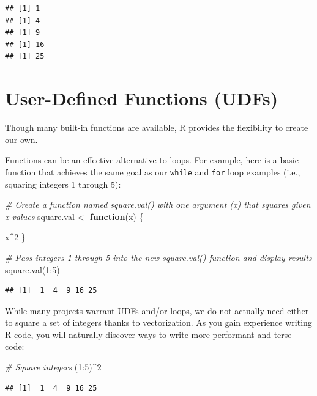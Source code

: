 \documentclass[
]{book}
\newenvironment{Shaded}{\begin{snugshade}}{\end{snugshade}}
\newcommand{\CommentTok}[1]{\textcolor[rgb]{0.56,0.35,0.01}{\textit{#1}}}
\newcommand{\ControlFlowTok}[1]{\textcolor[rgb]{0.13,0.29,0.53}{\textbf{#1}}}
\newcommand{\DecValTok}[1]{\textcolor[rgb]{0.00,0.00,0.81}{#1}}
\newcommand{\FunctionTok}[1]{\textcolor[rgb]{0.00,0.00,0.00}{#1}}
\newcommand{\NormalTok}[1]{#1}
\newcommand{\OtherTok}[1]{\textcolor[rgb]{0.56,0.35,0.01}{#1}}
\newcommand{\SpecialCharTok}[1]{\textcolor[rgb]{0.00,0.00,0.00}{#1}}
\begin{document}
\begin{verbatim}
## [1] 1
## [1] 4
## [1] 9
## [1] 16
## [1] 25
\end{verbatim}

\hypertarget{user-defined-functions-udfs}{%
\section{User-Defined Functions (UDFs)}\label{user-defined-functions-udfs}}

Though many built-in functions are available, R provides the flexibility to create our own.

Functions can be an effective alternative to loops. For example, here is a basic function that achieves the same goal as our \texttt{while} and \texttt{for} loop examples (i.e., squaring integers 1 through 5):

\begin{Shaded}
\begin{Highlighting}[]
\CommentTok{\# Create a function named square.val() with one argument (x) that squares given x values}
\NormalTok{square.val }\OtherTok{\textless{}{-}} \ControlFlowTok{function}\NormalTok{(x) \{}
  
\NormalTok{  x}\SpecialCharTok{\^{}}\DecValTok{2}
\NormalTok{\}}

\CommentTok{\# Pass integers 1 through 5 into the new square.val() function and display results}
\FunctionTok{square.val}\NormalTok{(}\DecValTok{1}\SpecialCharTok{:}\DecValTok{5}\NormalTok{)}
\end{Highlighting}
\end{Shaded}

\begin{verbatim}
## [1]  1  4  9 16 25
\end{verbatim}

While many projects warrant UDFs and/or loops, we do not actually need either to square a set of integers thanks to vectorization. As you gain experience writing R code, you will naturally discover ways to write more performant and terse code:

\begin{Shaded}
\begin{Highlighting}[]
\CommentTok{\# Square integers}
\NormalTok{(}\DecValTok{1}\SpecialCharTok{:}\DecValTok{5}\NormalTok{)}\SpecialCharTok{\^{}}\DecValTok{2}
\end{Highlighting}
\end{Shaded}

\begin{verbatim}
## [1]  1  4  9 16 25
\end{verbatim}
\end{document}
